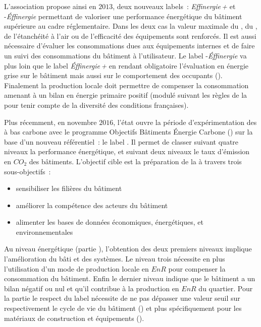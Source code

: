 L’association 
propose ainsi en $2013$, deux nouveaux labels~: \textit{Effinergie\,+} et
-\textit{Éffinergie} permettant de valoriser une performance énergétique du
bâtiment supérieure au cadre réglementaire. Dans les deux cas la valeur maximale du
, du , de l’étanchéité à l’air ou de l’efficacité des
équipements sont renforcés. Il est aussi nécessaire d’évaluer les consommations dues aux
équipements internes et de faire un suivi des consommations du bâtiment à l’utilisateur.
Le label -\textit{Éffinergie} va plus loin que le label \textit{Éffinergie\,+}
en rendant obligatoire l’évaluation en énergie grise sur le bâtiment mais aussi sur le
comportement des occupants ().
Finalement la production locale doit permettre de compenser la consommation amenant à un
bilan en énergie primaire positif (modulé suivant les règles de la  pour
tenir compte de la diversité des conditions françaises).

Plus récemment, en novembre $2016$, l’état ouvre la période d’expérimentation des
 à bas carbone avec le programme Objectifs Bâtiments Énergie Carbone
() sur la base d’un nouveau référentiel~: le label 
\parencite{Ministere2016}. Il permet de classer suivant quatre niveaux la performance énergétique,
et suivant deux niveaux le taux d’émission en $CO_{2}$ des bâtiments.
L’objectif cible est la préparation de la  à travers trois sous-objectifs~:
\begin{itemize}
    \item sensibiliser les filières du bâtiment
    \item améliorer la compétence des acteurs du bâtiment
    \item alimenter les bases de données économiques, énergétiques, et environnementales
\end{itemize}
Au niveau énergétique (partie ), l’obtention des deux premiers niveaux implique
l’amélioration du bâti et des systèmes. Le niveau trois nécessite en plus l’utilisation
d’un mode de production locale en $EnR$ pour compenser la consommation du bâtiment. Enfin
le dernier niveau indique que le bâtiment a un bilan négatif ou nul et qu’il contribue à
la production en $EnR$ du quartier. Pour la partie  le respect du label nécessite
de ne pas dépasser une valeur seuil sur respectivement le cycle de vie du bâtiment
() et plus spécifiquement pour les matériaux de construction et
équipements ().

